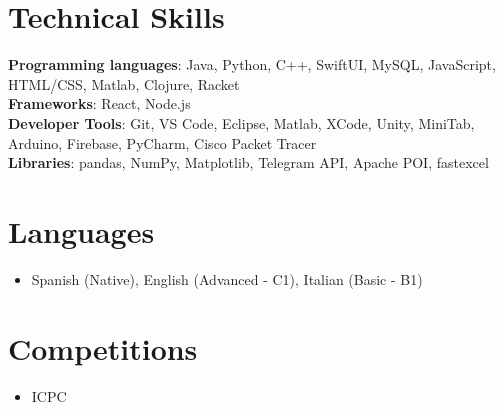 \documentclass[letterpaper,11pt]{article}
\newcommand{\resumeItem}[1]{
  \item\small{
    {#1 \vspace{-2pt}}
  }
}
\newcommand{\resumeItemListStart}{\begin{itemize}}
\newcommand{\resumeItemListEnd}{\end{itemize}\vspace{-5pt}}
\begin{document}
%
\section{Technical Skills}
 \begin{itemize}[leftmargin=0.15in, label={}]
    \small{\item{
     \textbf{Programming languages}{: Java, Python, C++, SwiftUI, MySQL, JavaScript, HTML/CSS, Matlab, Clojure, Racket} \\
     \textbf{Frameworks}{: React, Node.js} \\
     \textbf{Developer Tools}{: Git, VS Code, Eclipse, Matlab, XCode, Unity, MiniTab, Arduino, Firebase, PyCharm, Cisco Packet Tracer} \\
     \textbf{Libraries}{: pandas, NumPy, Matplotlib, Telegram API, Apache POI, fastexcel}
    }}
 \end{itemize}

%
\section{Languages}
\resumeItemListStart
    \resumeItem{Spanish (Native), English (Advanced - C1), Italian (Basic - B1)}
\resumeItemListEnd

%
\section{Competitions}
\resumeItemListStart
    \resumeItem{ICPC}
\resumeItemListEnd


\end{document}
